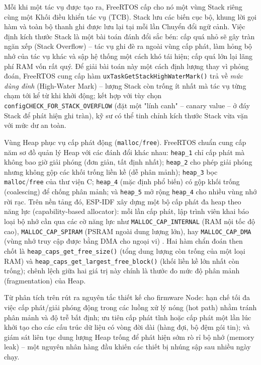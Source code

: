 Mỗi khi một tác vụ được tạo ra, FreeRTOS cấp cho nó một vùng Stack riêng cùng một Khối điều khiển tác vụ (TCB). Stack lưu các biến cục bộ, khung lời gọi hàm và toàn bộ thanh ghi được lưu lại tại mỗi lần Chuyển đổi ngữ cảnh. Việc định kích thước Stack là một bài toán đánh đổi sắc bén: cấp quá nhỏ sẽ gây tràn ngăn xếp (Stack Overflow) -- tác vụ ghi đè ra ngoài vùng cấp phát, làm hỏng bộ nhớ của tác vụ khác và sập hệ thống một cách khó tái hiện; cấp quá lớn lại lãng phí RAM vốn rất quý. Để giải bài toán này một cách định lượng thay vì phỏng đoán, FreeRTOS cung cấp hàm \texttt{uxTaskGetStackHighWaterMark()} trả về \textit{mức dùng đỉnh} (High-Water Mark) -- lượng Stack còn trống ít nhất mà tác vụ từng chạm tới kể từ khi khởi động; kết hợp với tùy chọn \texttt{configCHECK\_FOR\_STACK\_OVERFLOW} (đặt một "lính canh" -- canary value -- ở đáy Stack để phát hiện ghi tràn), kỹ sư có thể tinh chỉnh kích thước Stack vừa vặn với mức dư an toàn.

Vùng Heap phục vụ cấp phát động (\texttt{malloc}/\texttt{free}). FreeRTOS chuẩn cung cấp năm sơ đồ quản lý Heap với các đánh đổi khác nhau: \texttt{heap\_1} chỉ cấp phát mà không bao giờ giải phóng (đơn giản, tất định nhất); \texttt{heap\_2} cho phép giải phóng nhưng không gộp các khối trống liền kề (dễ phân mảnh); \texttt{heap\_3} bọc \texttt{malloc}/\texttt{free} của thư viện C; \texttt{heap\_4} (mặc định phổ biến) có gộp khối trống (coalescing) để chống phân mảnh; và \texttt{heap\_5} mở rộng \texttt{heap\_4} cho nhiều vùng nhớ rời rạc. Trên nền tảng đó, ESP-IDF xây dựng một bộ cấp phát đa heap theo năng lực (capability-based allocator): mỗi lần cấp phát, lập trình viên khai báo loại bộ nhớ cần qua các cờ năng lực như \texttt{MALLOC\_CAP\_INTERNAL} (RAM nội tốc độ cao), \texttt{MALLOC\_CAP\_SPIRAM} (PSRAM ngoài dung lượng lớn), hay \texttt{MALLOC\_CAP\_DMA} (vùng nhớ truy cập được bằng DMA cho ngoại vi) \cite{espressif_mem_alloc}. Hai hàm chẩn đoán then chốt là \texttt{heap\_caps\_get\_free\_size()} (tổng dung lượng còn trống của một loại RAM) và \texttt{heap\_caps\_get\_largest\_free\_block()} (khối liền kề lớn nhất còn trống); chênh lệch giữa hai giá trị này chính là thước đo mức độ phân mảnh (fragmentation) của Heap.

Từ phân tích trên rút ra nguyên tắc thiết kế cho firmware Node: hạn chế tối đa việc cấp phát/giải phóng động trong các luồng xử lý nóng (hot path) nhằm tránh phân mảnh và độ trễ bất định; ưu tiên cấp phát tĩnh hoặc cấp phát một lần lúc khởi tạo cho các cấu trúc dữ liệu có vòng đời dài (hàng đợi, bộ đệm gói tin); và giám sát liên tục dung lượng Heap trống để phát hiện sớm rò rỉ bộ nhớ (memory leak) -- một nguyên nhân hàng đầu khiến các thiết bị nhúng sập sau nhiều ngày chạy.

